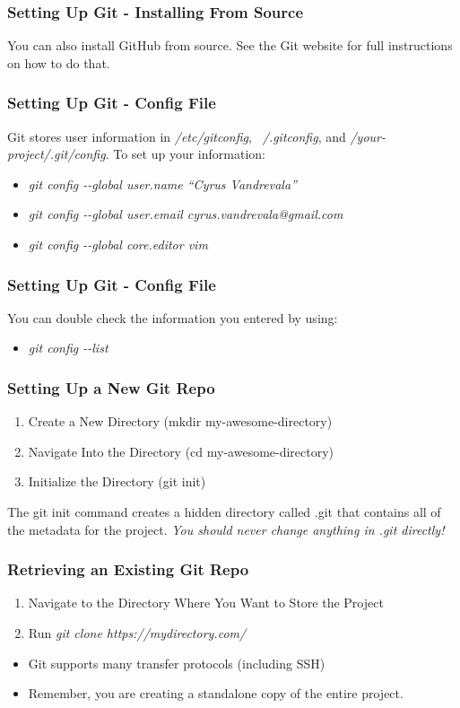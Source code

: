 \begin{frame}
\frametitle{\large{Setting Up Git - Installing From Source}}
You can also install GitHub from source. See the Git website for full instructions on how to do that.
\end{frame}

\begin{frame}
\frametitle{\large{Setting Up Git - Config File}}
Git stores user information in \emph{/etc/gitconfig}, \emph{~/.gitconfig}, and \emph{/your-project/.git/config}. To set up your information: \\
\begin{itemize}
\item \emph{git config -{}-global user.name ``Cyrus Vandrevala''}
\item \emph{git config -{}-global user.email cyrus.vandrevala@gmail.com}
\item \emph{git config -{}-global core.editor vim}
\end{itemize}
\end{frame}
\note{}

\begin{frame}
\frametitle{\large{Setting Up Git - Config File}}
You can double check the information you entered by using: \\
\begin{itemize}
\item \emph{git config -{}-list}
\end{itemize}
\end{frame}
\note{}

\begin{frame}
\frametitle{\large{Setting Up a New Git Repo}}
\begin{enumerate}
\item Create a New Directory (mkdir my-awesome-directory)
\item Navigate Into the Directory (cd my-awesome-directory)
\item Initialize the Directory (git init)
\end{enumerate}
\vspace{5mm}
The git init command creates a hidden directory called .git that contains all of the metadata for the project. \emph{You should never change anything in .git directly!}
\end{frame}
\note{}

\begin{frame}
\frametitle{\large{Retrieving an Existing Git Repo}}
\begin{enumerate}
\item Navigate to the Directory Where You Want to Store the Project
\item Run \emph{git clone https://mydirectory.com/}
\end{enumerate}
\vspace{5mm}
\begin{itemize}
\item Git supports many transfer protocols (including SSH)
\item Remember, you are creating a standalone copy of the entire project.
\end{itemize}
\end{frame}
\note{}